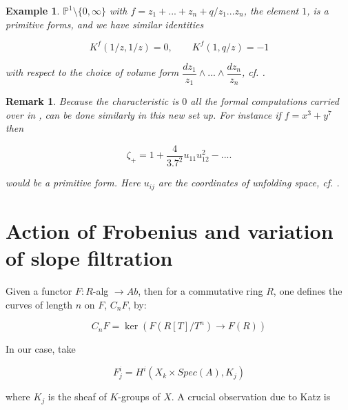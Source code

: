 \documentclass[12pt,twoside]{amsart}
\newtheorem{remark}[theorem]{Remark}
\newtheorem{example}[theorem]{Example}
\begin{document}
\vspace{0.5cm}

\begin{example}
$\mathbb{P}^1 \setminus \{0,\infty \}$ with $f=z_1+...+z_n+q/z_1...z_n$, the element $1$, is a  primitive forms, and we have similar identities

\[ K^f(1/z,1/z)=0, \qquad K^f(1,q/z)=-1 \]

\vspace{0.5cm}

\noindent
with respect to the choice of volume form $\dfrac{dz_1}{z_1} \wedge ... \wedge \dfrac{dz_n}{z_n}$, cf. \cite{LLS}.
\end{example}

\vspace{0.5cm}

\begin{remark}
Because the characteristic is $0$ all the formal computations carried over in \cite{LLS}, can be done similarly in this new set up. For instance if $f=x^3+y^7$
then 

\[ \zeta_+=1+\dfrac{4}{3.7^2}u_{11}u_{12}^2-.... \]

\vspace{0.5cm}

\noindent
would be a primitive form. Here $u_{ij}$ are the coordinates of unfolding space, cf. \cite{LLS}.
\end{remark}

\vspace{0.5cm}

\section{Action of Frobenius and variation of slope filtration}

\vspace{0.5cm}

Given a functor $F: R$-alg $\to Ab$, then for a commutative ring $R$, one defines the curves of length $n$ on $F$, $C_nF$, by: 

\[ C_nF=\ker(F(R[T]/T^n) \to F(R)) \]

\vspace{0.5cm}

\noindent
In our case, take 

\[ F_j^i=H^i(X_k \times Spec(A), K_j) \]

\vspace{0.5cm}

\noindent
where $K_j$ is the sheaf of $K$-groups of $X$. A crucial observation due to Katz is 
\end{document}
